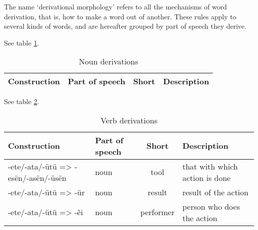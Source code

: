 The name ‘derivational morphology’ refers to all the mechanisms of word derivation, that is, how to
make a word out of another. These rules apply to several kinds of words, and are hereafter grouped
by part of speech they derive.

See table \ref{tab:noun-derivations}.

\begin{table}[h]
\begin{center}
\begin{tabular}{|l|l|c|l|}\hline

\textbf{Construction} & \textbf{Part of speech} & \textbf{Short} & \textbf{Description} \\\hline

\end{tabular}
\end{center}
\caption{Noun derivations}
\label{tab:noun-derivations}
\end{table}

See table \ref{tab:verb-derivations}.

\begin{table}[h]
\begin{center}
\begin{tabular}{|l|l|c|l|}\hline

\textbf{Construction} & \textbf{Part of speech} & \textbf{Short} & \textbf{Description} \\\hline

-ete/-ata/-ütü => -esën/-asën/-üsën & noun & tool & that with which action is done \\\hline
-ete/-ata/-ütü => -ür & noun & result & result of the action \\\hline
-ete/-ata/-ütü => -ẽi & noun & performer & person who does the action \\\hline

\end{tabular}
\end{center}
\caption{Verb derivations}
\label{tab:verb-derivations}
\end{table}


